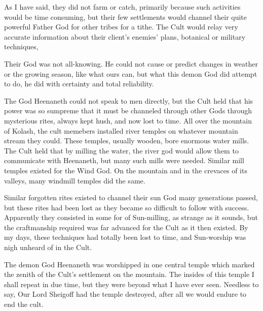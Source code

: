 \documentclass{article}
\begin{document}
As I have said, they did not farm or catch, primarily because such activities would be time consuming, but their few settlements would channel their quite powerful Father God for other tribes for a tithe. The Cult would relay very accurate information about their client's enemies' plans, botanical or military techniques,

Their God was not all-knowing. He could not cause or predict changes in weather or the growing season, like what ours can, but what this demon God did attempt to do, he did with certainty and total reliability.

The God Heenaneth could not speak to men directly, but the Cult held that his power was so sumpreme that it must be channeled through other Gods through mysterious rites, always kept hush, and now lost to time. All over the mountain of Kolash, the cult memebers installed river temples on whatever mountain stream they could. These temples, usually wooden, bore enormous water mills. The Cult held that by milling the water, the river god would allow them to communicate with Heenaneth, but many such mills were needed. Similar mill temples existed for the Wind God. On the mountain and in the crevaces of its valleys, many windmill temples did the same.

Similar forgotten rites existed to channel their sun God many generations passed, but these rites had been lost as they became so difficult to follow with success. Apparently they consisted in some for of Sun-milling, as strange as it sounds, but the craftmanship required was far advanced for the Cult as it then existed. By my days, these techniques had totally been lost to time, and Sun-worship was nigh unheard of in the Cult.

The demon God Heenaneth was worshipped in one central temple which marked the zenith of the Cult's settlement on the mountain.  The insides of this temple I shall repeat in due time, but they were beyond what I have ever seen. Needless to say, Our Lord Sheigoff had the temple destroyed, after all we would endure to end the cult. 



\end{document}
